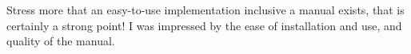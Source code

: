 \begin{point}{}
    Stress more that an easy-to-use implementation inclusive a manual exists, that is
certainly a strong point! I was impressed by the ease of installation and use, and quality of the manual.
\end{point}

